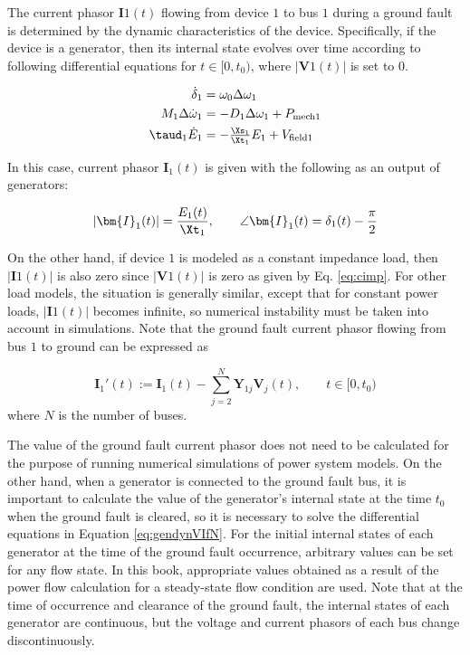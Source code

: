 \documentclass[graybox, envcountchap]{svmult}
\begin{document}
The current phasor $\bm{I}{1}(t)$ flowing from device $1$ to bus $1$ during a
ground fault is determined by the dynamic characteristics of the device.
Specifically, if the device is a generator, then its internal state evolves over
time according to following differential equations for $t\in [0, t_0)$, where
$|\bm{V}{1}(t)|$ is set to 0. 

\begin{equation}\label{eq:gendynVIfN}
  \begin{aligned}
    \dot{\delta}_1&= \omega_0  \Delta \omega_1\\
    M_1   \Delta \dot{\omega}_1 &= 
    - D_1 \Delta\omega_1  
    +P_{{\rm mech}1} 
    \\
    \taud_1 \dot{E}_1 & = 
    - \tfrac{ \Xs_1 }{ \Xt_1 }E_1
    + V_{{\rm field}1}
  \end{aligned}
\end{equation}

In this case, current phasor $\bm{I}_{1}(t)$ is given with the following as an
output of generators:

\begin{align*}%
|\bm{I}_1(t)|=\frac{E_1 (t)}{ \Xt_1 }
,\qquad
\angle \bm{I}_1 (t) = \delta_1 (t) - \frac{\pi}{2}
\end{align*}

On the other hand, if device $1$ is modeled as a constant impedance load,
then $|\bm{I}{1}(t)|$ is also zero since $|\bm{V}{1}(t)|$ is zero as given by
Eq. \eqref{eq:cimp}. For other load models, the situation is generally similar,
except that for constant power loads, $|\bm{I}{1}(t)|$ becomes infinite, so
numerical instability must be taken into account in simulations. Note that the
ground fault current phasor flowing from bus $1$ to ground can be expressed as

\[
  \bm{I}_{1}'(t) := \bm{I}_{1}(t) - \sum_{j=2}^{N} \bm{Y}_{1j} \bm{V}_{j}(t),\qquad
  t \in [0, t_0)
\]
where $N$ is the number of buses.

The value of the ground fault current phasor does not need to be calculated for
the purpose of running numerical simulations of power system models. On the
other hand, when a generator is connected to the ground fault bus, it is
important to calculate the value of the generator's internal state at the time
$t_0$ when the ground fault is cleared, so it is necessary to solve the
differential equations in Equation \ref{eq:gendynVIfN}. For the initial internal
states of each generator at the time of the ground fault occurrence, arbitrary
values can be set for any flow state. In this book, appropriate values obtained
as a result of the power flow calculation for a steady-state flow condition are
used. Note that at the time of occurrence and clearance of the ground fault, the
internal states of each generator are continuous, but the voltage and current
phasors of each bus change discontinuously.
\end{document}
